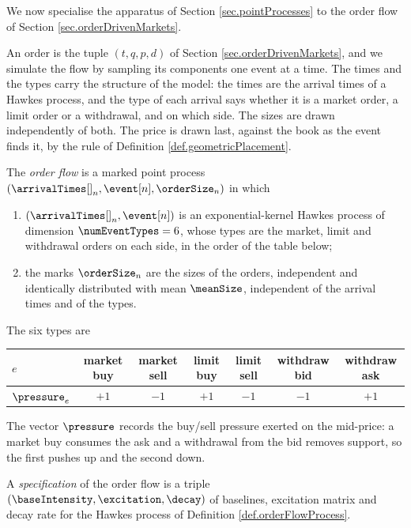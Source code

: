 We now specialise the apparatus of Section \ref{sec.pointProcesses} to the order flow of
Section \ref{sec.orderDrivenMarkets}.

An order is the tuple $(t,q,p,d)$ of Section \ref{sec.orderDrivenMarkets},
and we simulate the flow by sampling its components one event at a time.
The times and the types carry the structure of the model:
the times are the arrival times of a Hawkes process,
and the type of each arrival says whether it is a market order, a limit order or a
withdrawal, and on which side.
The sizes are drawn independently of both.
The price is drawn last, against the book as the event finds it,
by the rule of Definition \ref{def.geometricPlacement}.

\begin{defi}\label{def.orderFlowProcess}
 The \emph{order flow} is a marked point process $(\arrivalTimes[]_n, \event[n], \orderSize_n)$
 in which
 \begin{enumerate}[label={\emph{\roman{*}}.}]
  \item $(\arrivalTimes[]_n, \event[n])$ is an exponential-kernel Hawkes process of dimension
        $\numEventTypes = 6$, whose types are the market, limit and withdrawal orders on each
        side, in the order of the table below;
  \item the marks $\orderSize_n$ are the sizes of the orders, independent and identically
        distributed with mean $\meanSize$, independent of the arrival times and of the types.
 \end{enumerate}
\end{defi}

The six types are
\begin{center}
 \begin{tabular}{lcccccc}
  \toprule
  $e$ & market buy & market sell & limit buy & limit sell & withdraw bid & withdraw ask \\
  \midrule
  $\pressure_e$ & $+1$ & $-1$ & $+1$ & $-1$ & $-1$ & $+1$ \\
  \bottomrule
 \end{tabular}
\end{center}
The vector $\pressure$ records the buy/sell pressure exerted on the mid-price:
a market buy consumes the ask and a withdrawal from the bid removes support,
so the first pushes up and the second down.

\begin{defi}\label{def.orderFlowSpecification}
 A \emph{specification} of the order flow is a triple
 $(\baseIntensity, \excitation, \decay)$ of baselines, excitation matrix and decay rate
 for the Hawkes process of Definition \ref{def.orderFlowProcess}.
\end{defi}


